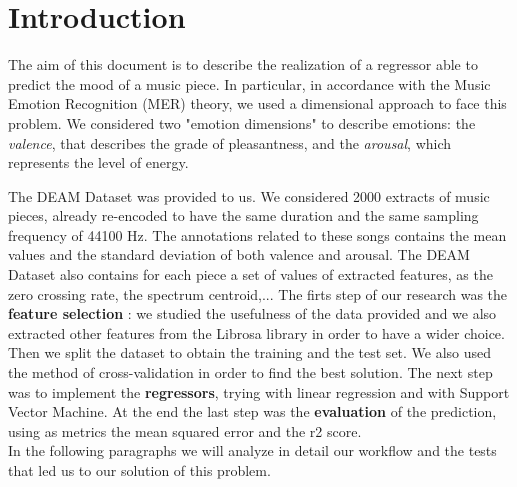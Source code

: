 \section{Introduction}


The aim of this document is to describe the realization of a regressor able to predict the mood of a music piece. In particular, in accordance with the Music Emotion Recognition (MER) theory, we used a dimensional approach to face this problem. We considered two "emotion dimensions" to describe emotions: the \textit{valence}, that describes the grade of pleasantness, and the \textit{arousal}, which represents the level of energy.

The DEAM Dataset was provided to us. We considered 2000 extracts of music pieces, already re-encoded to have the same duration and the same sampling frequency of 44100 Hz. The annotations related to these songs contains the mean values and the standard deviation of both valence and arousal. The DEAM Dataset also contains for each piece a set of values of extracted features, as the zero crossing rate, the spectrum centroid,... The firts step of our research was the \textbf{feature selection} : we studied the usefulness of the data provided and we also extracted other features from the Librosa library in order to have a wider choice. Then we split the dataset to obtain the training and the test set. We also used the method of cross-validation in order to find the best solution. The next step was to implement the \textbf{regressors}, trying with linear regression and with Support Vector Machine. At the end the last step was the \textbf{evaluation} of the prediction, using as metrics the mean squared error and the r2 score.\\In the following paragraphs we will analyze in detail our workflow and the tests that led us to our solution of this problem.



